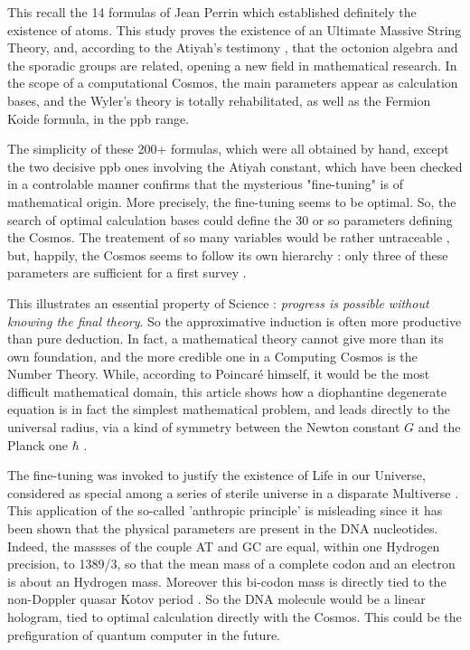 \documentclass[a4paper,9pt]{article}
\begin{document}
This recall the 14 formulas of Jean Perrin which established definitely the existence of atoms. This study proves the existence of an Ultimate Massive String Theory, and, according to the Atiyah's testimony \cite{Atiyah}, that the octonion algebra and the sporadic groups are related, opening a new field in mathematical research. In the scope of a computational Cosmos, the main parameters appear as calculation bases, and the Wyler's theory is totally rehabilitated, as well as the Fermion Koide formula, in the ppb range.  



The simplicity of these 200+ formulas, which were all obtained by hand, except the two decisive ppb ones involving the Atiyah constant, which have been checked in a controlable manner \cite{LaGuer} confirms that the mysterious "fine-tuning" is of mathematical origin. More precisely, the fine-tuning seems to be optimal. So, the search of optimal calculation bases could define the 30 or so parameters defining the Cosmos. The treatement of so many variables would be rather untraceable , but, happily, the Cosmos seems to follow its own hierarchy : only three of these parameters are sufficient for a first survey \cite{Carr}. 


This illustrates an essential property of Science : \textit{progress is possible without knowing the final theory}. So the approximative induction is often more productive than pure deduction. In fact, a mathematical theory cannot give more than its own foundation, and the more credible one in a Computing Cosmos is the Number Theory. While, according to Poincar\'e himself, it would be the most difficult mathematical domain, this article shows how a diophantine degenerate equation is in fact the simplest mathematical problem, and leads directly to the universal radius, via a kind of symmetry between the Newton constant $G$ and the Planck one $\hbar$ .   


The fine-tuning was invoked to justify the existence of Life in our Universe, considered as special among a series of sterile universe in a disparate Multiverse \cite{Carr}. This application of the so-called 'anthropic principle' is misleading since it has been shown that the physical parameters are present in the DNA nucleotides. Indeed, the massses of the couple AT and GC are equal, within one Hydrogen precision, to 1389/3, so that the mean mass of a complete codon and an electron is about an Hydrogen mass. Moreover this bi-codon mass is directly tied to the non-Doppler quasar Kotov period \cite{Sanchez3}. So the DNA molecule would be a linear hologram, tied to optimal calculation directly with the Cosmos. This could be the prefiguration of quantum computer in the future.
\end{document}
